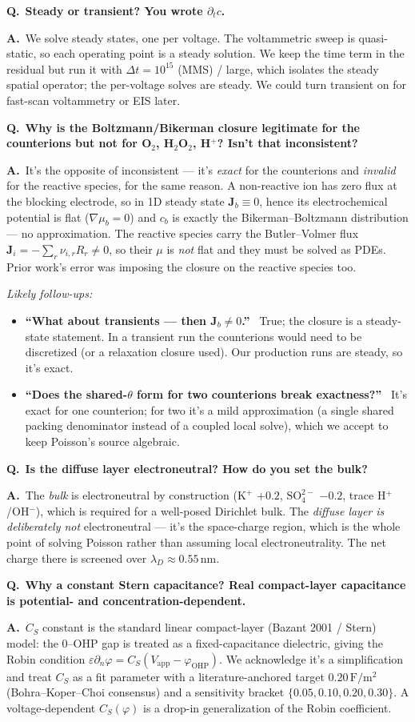 \documentclass[11pt]{article}
\newcommand{\CS}{C_{S}}
\newcommand{\Jbf}{\mathbf{J}}
\newcommand{\Q}[1]{\medskip\par\noindent\textcolor{qcol}{\textbf{Q.}}\ \textbf{#1}\par\nopagebreak\smallskip}
\newcommand{\A}{\noindent\textbf{A.}\ \ignorespaces}
\newenvironment{followups}{\par\smallskip\noindent\emph{Likely follow-ups:}\begin{itemize}[leftmargin=1.6em,topsep=1pt]}{\end{itemize}}
\newcommand{\fu}[1]{\item \textbf{``#1''}\ }
\begin{document}
\Q{Steady or transient? You wrote $\partial_t c$.}
\A We solve steady states, one per voltage. The voltammetric sweep is
quasi-static, so each operating point is a steady solution. We keep the time
term in the residual but run it with $\Delta t=10^{15}$ (MMS) / large, which
isolates the steady spatial operator; the per-voltage solves are steady. We
could turn transient on for fast-scan voltammetry or EIS later.

\Q{Why is the Boltzmann/Bikerman closure legitimate for the counterions but
not for O$_2$, H$_2$O$_2$, H$^+$? Isn't that inconsistent?}
\A It's the opposite of inconsistent --- it's \emph{exact} for the
counterions and \emph{invalid} for the reactive species, for the same
reason. A non-reactive ion has zero flux at the blocking electrode, so in 1D
steady state $\Jbf_b\equiv0$, hence its electrochemical potential is flat
($\nabla\mu_b=0$) and $c_b$ is exactly the Bikerman--Boltzmann distribution
--- no approximation. The reactive species carry the Butler--Volmer flux
$\Jbf_i=-\sum_r\nu_{i,r}R_r\neq0$, so their $\mu$ is \emph{not} flat and they
must be solved as PDEs. Prior work's error was imposing the closure on the
reactive species too.
\begin{followups}
\fu{What about transients --- then $\Jbf_b\neq0$.} True; the closure is a
steady-state statement. In a transient run the counterions would need to be
discretized (or a relaxation closure used). Our production runs are steady,
so it's exact.
\fu{Does the shared-$\theta$ form for two counterions break exactness?} It's
exact for one counterion; for two it's a mild approximation (a single shared
packing denominator instead of a coupled local solve), which we accept to
keep Poisson's source algebraic.
\end{followups}

\Q{Is the diffuse layer electroneutral? How do you set the bulk?}
\A The \emph{bulk} is electroneutral by construction ($\mathrm{K^+}$ $+0.2$,
$\mathrm{SO_4^{2-}}$ $-0.2$, trace H$^+$/OH$^-$), which is required for a
well-posed Dirichlet bulk. The \emph{diffuse layer is deliberately not}
electroneutral --- it's the space-charge region, which is the whole point of
solving Poisson rather than assuming local electroneutrality. The net charge
there is screened over $\lambda_D\approx0.55$\,nm.

\Q{Why a constant Stern capacitance? Real compact-layer capacitance is
potential- and concentration-dependent.}
\A $\CS$ constant is the standard linear compact-layer (Bazant 2001 / Stern)
model: the 0--OHP gap is treated as a fixed-capacitance dielectric, giving
the Robin condition $\varepsilon\partial_n\varphi=\CS(V_{\mathrm{app}}-
\varphi_{\mathrm{OHP}})$. We acknowledge it's a simplification and treat
$\CS$ as a fit parameter with a literature-anchored target
$0.20\,\mathrm{F/m^2}$ (Bohra--Koper--Choi consensus) and a sensitivity
bracket $\{0.05,0.10,0.20,0.30\}$. A voltage-dependent $\CS(\varphi)$ is a
drop-in generalization of the Robin coefficient.
\end{document}
